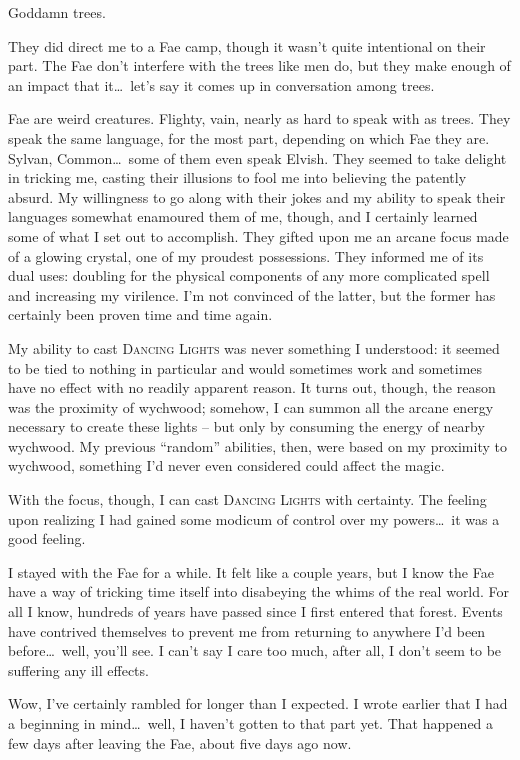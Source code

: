 Goddamn trees.

They did direct me to a Fae camp, though it wasn't quite intentional on their part. The Fae don't interfere with the trees like men do, but they make enough of an impact that it\dots\ let's say it comes up in conversation among trees.

Fae are weird creatures. Flighty, vain, nearly as hard to speak with as trees. They speak the same language, for the most part, depending on which Fae they are. Sylvan, Common\dots\ some of them even speak Elvish. They seemed to take delight in tricking me, casting their illusions to fool me into believing the patently absurd. My willingness to go along with their jokes and my ability to speak their languages somewhat enamoured them of me, though, and I certainly learned some of what I set out to accomplish. They gifted upon me an arcane focus made of a glowing crystal, one of my proudest possessions. They informed me of its dual uses: doubling for the physical components of any more complicated spell and increasing my virilence. I'm not convinced of the latter, but the former has certainly been proven time and time again.

My ability to cast \textsc{Dancing Lights} was never something I understood: it seemed to be tied to nothing in particular and would sometimes work and sometimes have no effect with no readily apparent reason. It turns out, though, the reason was the proximity of wychwood; somehow, I can summon all the arcane energy necessary to create these lights -- but only by consuming the energy of nearby wychwood. My previous ``random'' abilities, then, were based on my proximity to wychwood, something I'd never even considered could affect the magic.

With the focus, though, I can cast \textsc{Dancing Lights} with certainty. The feeling upon realizing I had gained some modicum of control over my powers\dots\ it was a good feeling.

I stayed with the Fae for a while. It felt like a couple years, but I know the Fae have a way of tricking time itself into disabeying the whims of the real world. For all I know, hundreds of years have passed since I first entered that forest. Events have contrived themselves to prevent me from returning to anywhere I'd been before\dots\ well, you'll see. I can't say I care too much, after all, I don't seem to be suffering any ill effects.

Wow, I've certainly rambled for longer than I expected. I wrote earlier that I had a beginning in mind\dots\ well, I haven't gotten to that part yet. That happened a few days after leaving the Fae, about five days ago now.
